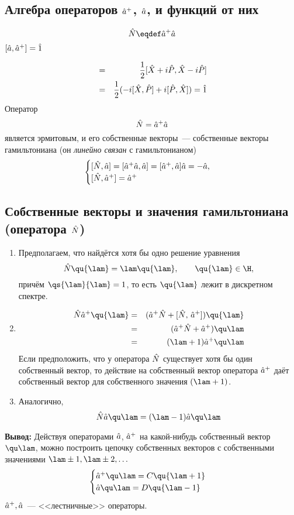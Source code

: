 \subsection{Алгебра операторов $\Hat a^+$, $\Hat a$, и функций от них}
$$
    \Hat N \eqdef \Hat a^+ \Hat a
$$
\Lem $[\Hat a, \Hat a^+] = \Hat 1$

\Proof
\begin{eqnarray*}
    [\hat a, \hat a^+] &=& \dfrac12 [\Hat X + i \Hat P, \Hat X - i \hat P]\\
                        &=& \dfrac12 (-i [\Hat X, \Hat P] + i [\Hat P, \Hat X]) = \Hat 1
\end{eqnarray*}
Оператор
$$
    \hat N = \Hat a^+ \Hat a
$$
является эрмитовым, и его собственные векторы~--- собственные векторы гамильтониана (он \emph{линейно связан} с гамильтонианом)
$$
\begin{cases}
    [\Hat N, \Hat a] = [\Hat a^+ \Hat a, \Hat a] = [\Hat a^+, \Hat a]\Hat a = -\Hat a,\\
    [\Hat N, \Hat a^+] = \Hat a^+
\end{cases}
$$
\subsection[Собственные векторы и значения $\Hat H, \Hat N$]{Собственные векторы и значения гамильтониана (оператора $\Hat N$)} 
\begin{enumerate}
  \item Предполагаем, что найдётся хотя бы одно решение уравнения
  $$
    \Hat N \qu{\lam} = \lam \qu{\lam}, \qquad \qu{\lam} \in \H,
  $$
  причём $\qs{\lam}{\lam} = 1$, то есть $\qu{\lam}$ лежит в дискретном спектре.
  \item
  \begin{eqnarray*}
    \Hat N \Hat a^+ \qu{\lam} &=& (\Hat a^+ \Hat N + [\Hat N, \, \hat a^+]) \qu{\lam}\\
    &=& (\Hat a^+ \Hat N + \Hat a^+ ) \qu \lam \\
    &=& (\lam+1) \Hat a^+ \qu \lam
  \end{eqnarray*}
  Если предположить, что у оператора $\Hat N$ существует хотя бы один собственный вектор, то действие на собственный вектор оператора $\Hat a^+$ даёт собственный вектор для собственного значения $(\lam + 1)$.
  \item Аналогично,
  $$
    \Hat N \Hat a \qu \lam = (\lam - 1) \Hat a \qu \lam
  $$
\end{enumerate}
\textbf{Вывод:}
Действуя операторами $\Hat a$, $\Hat a^+$ на какой-нибудь собственный вектор $\qu \lam$, можно построить цепочку собственных векторов с собственными значениями $\lam \pm 1, \lam \pm 2, \ldots$
$$
    \begin{cases}
        \Hat a^+ \qu \lam = C \qu{\lam + 1}\\
        \Hat a \qu \lam = D \qu{\lam - 1}
    \end{cases}
$$
$\Hat a^+, \hat a$~--- <<лестничные>> операторы.

